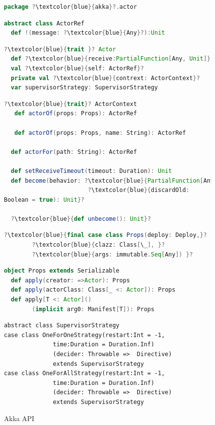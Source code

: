 \begin{figure}[!h]
\label{akka_api}
\begin{lstlisting}[language=scala, escapechar=?]
package ?\textcolor{blue}{akka}?.actor   
\end{lstlisting}
\begin{lstlisting}[language=scala, escapechar=?]
abstract class ActorRef
  def !(message: ?\textcolor{blue}{Any}?):Unit
\end{lstlisting}
\vspace{20pt}
    \begin{lstlisting}[language=scala, escapechar=?]
?\textcolor{blue}{trait }? Actor
  def ?\textcolor{blue}{receive:PartialFunction[Any, Unit]}?
  val ?\textcolor{blue}{self: ActorRef}?
  private val ?\textcolor{blue}{contrext: ActorContext}?
  var supervisorStrategy: SupervisorStrategy
\end{lstlisting}

      \begin{lstlisting}[language=scala, escapechar=?]
?\textcolor{blue}{trait}? ActorContext
   def actorOf(props: Props): ActorRef
   
   def actorOf(props: Props, name: String): ActorRef

  def actorFor(path: String): ActorRef
  
  def setReceiveTimeout(timeout: Duration): Unit
  def become(behavior: ?\textcolor{blue}{PartialFunction[Any, Unit]}?, 
  						?\textcolor{blue}{discardOld: 
Boolean = true): Unit}?
						
  ?\textcolor{blue}{def unbecome(): Unit}?

    \end{lstlisting}

    \begin{lstlisting}[language=scala, escapechar=?]
?\textcolor{blue}{final case class Props(deploy: Deploy,}?
		?\textcolor{blue}{clazz: Class[\_], }?
		?\textcolor{blue}{args: immutable.Seq[Any]) }?
    \end{lstlisting}
    \begin{lstlisting}[language=scala, escapechar=?]
object Props extends Serializable
  def apply(creator: =>Actor): Props
  def apply(actorClass: Class[_ <: Actor]): Props  
  def apply[T <: Actor]()
  		(implicit arg0: Manifest[T]): Props  
    \end{lstlisting}

    \begin{lstlisting}    
abstract class SupervisorStrategy
case class OneForOneStrategy(restart:Int = -1, 
              time:Duration = Duration.Inf)
              (decider: Throwable =>  Directive) 
              extends SupervisorStrategy
case class OneForAllStrategy(restart:Int = -1, 
              time:Duration = Duration.Inf)
              (decider: Throwable =>  Directive) 
              extends SupervisorStrategy
    \end{lstlisting}
    
    \caption{Akka API}
    \vspace{-10pt }
\end{figure}

